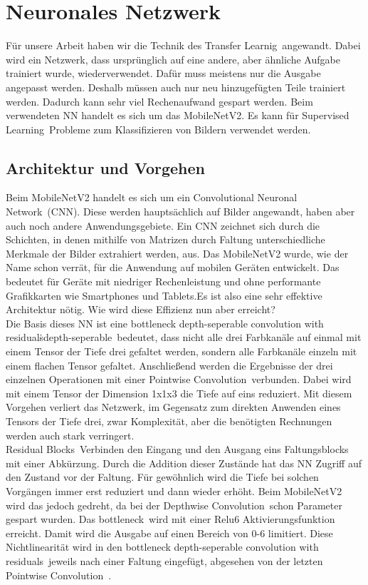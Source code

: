 \documentclass[12pt,toc=bib,toc=listof]{scrreprt}
\begin{document}
\chapter{Neuronales Netzwerk} %
\label{sec:nn}
Für unsere Arbeit haben wir die Technik des \dq Transfer Learnig\dq\ angewandt. Dabei wird ein Netzwerk, dass ursprünglich auf eine andere, aber ähnliche Aufgabe trainiert wurde, wiederverwendet. Dafür muss meistens nur die Ausgabe angepasst werden. Deshalb müssen auch nur neu hinzugefügten Teile trainiert werden. Dadurch kann sehr viel Rechenaufwand gespart werden. Beim verwendeten NN handelt es sich um das MobileNetV2. Es kann für \dq Supervised Learning\dq\ Probleme zum Klassifizieren von Bildern verwendet werden.

\section{Architektur und Vorgehen}
\label{sec_nn:architecture}

Beim MobileNetV2 handelt es sich um ein \dq Convolutional Neuronal Network\dq\  (CNN). Diese werden hauptsächlich auf Bilder angewandt, haben aber auch noch andere Anwendungsgebiete. Ein CNN zeichnet sich durch die Schichten, in denen mithilfe von Matrizen durch Faltung unterschiedliche Merkmale der Bilder extrahiert werden, aus. Das MobileNetV2 wurde, wie der Name schon verrät, für die Anwendung auf mobilen Geräten entwickelt. Das bedeutet für Geräte mit niedriger Rechenleistung und ohne performante Grafikkarten wie Smartphones und Tablets.Es ist also eine sehr effektive Architektur nötig. Wie wird diese Effizienz nun aber erreicht? \\
Die Basis dieses NN ist eine \dq bottleneck depth-seperable convolution with residuals\dq\. \dq depth-seperable\dq\ bedeutet, dass nicht alle drei Farbkanäle auf einmal mit einem Tensor der Tiefe drei gefaltet werden, sondern alle Farbkanäle einzeln mit einem flachen Tensor gefaltet. Anschließend werden die Ergebnisse der drei einzelnen Operationen mit einer \dq Pointwise Convolution\dq\ verbunden. Dabei wird mit einem Tensor der Dimension 1x1x3 die Tiefe auf eins reduziert. Mit diesem Vorgehen verliert das Netzwerk, im Gegensatz zum direkten Anwenden eines Tensors der Tiefe drei, zwar Komplexität, aber die benötigten Rechnungen werden auch stark verringert. \cite{seperable_convolution} \\
\dq Residual Blocks\dq\ Verbinden den Eingang und den Ausgang eins Faltungsblocks mit einer Abkürzung. Durch die Addition dieser Zustände hat das NN Zugriff auf den Zustand vor der Faltung. Für gewöhnlich wird die Tiefe bei solchen Vorgängen immer erst reduziert und dann wieder erhöht. \cite{residuals_and_bottleneck} Beim MobileNetV2 wird das jedoch gedreht, da bei der \dq Depthwise Convolution\dq\ schon Parameter gespart wurden. Das \dq bottleneck\dq\ wird mit einer Relu6 Aktivierungsfunktion erreicht. Damit wird die Ausgabe auf einen Bereich von 0-6 limitiert. Diese Nichtlinearität wird in den \dq bottleneck depth-seperable convolution with residuals\dq\ jeweils nach einer Faltung eingefügt, abgesehen von der letzten \dq Pointwise Convolution\dq\ .
\end{document}
